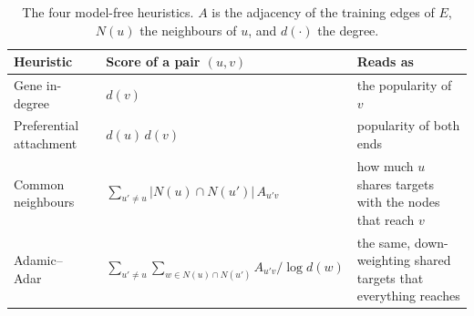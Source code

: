 \begin{table}[h!]
\caption{The four model-free heuristics. $A$ is the adjacency of the training edges of $E$, $N(u)$ the neighbours of $u$, and $d(\cdot)$ the degree.}
\label{tab:heuristics}
\small
\begin{tabular}{p{3.2cm}p{5.3cm}p{3.6cm}}
\hline
Heuristic & Score of a pair $(u,v)$ & Reads as \\
\hline
Gene in-degree & $d(v)$ & the popularity of $v$ \\
Preferential attachment~\cite{barabasi1999scaling,liben2007link} & $d(u)\,d(v)$ & popularity of both ends \\
Common neighbours~\cite{liben2007link} & $\sum_{u'\neq u} |N(u)\cap N(u')|\,A_{u'v}$ & how much $u$ shares targets with the nodes that reach $v$ \\
Adamic--Adar~\cite{adamic2003friends} & $\sum_{u'\neq u}\sum_{w\in N(u)\cap N(u')} A_{u'v}/\log d(w)$ & the same, down-weighting shared targets that everything reaches \\
\hline
\end{tabular}
\end{table}
